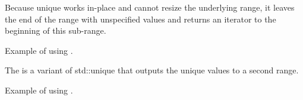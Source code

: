 Because unique works in-place and cannot resize the underlying range, it leaves the end of the range with unspecified values and returns an iterator to the beginning of this sub-range.

\begin{box-note}
\footnotesize Example of using .
\tcblower
{}
\end{box-note}

The  is a variant of std::unique that outputs the unique values to a second range.


\begin{box-note}
\footnotesize Example of using .
\tcblower
{}
\end{box-note}